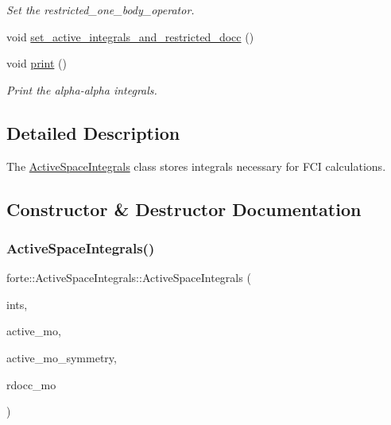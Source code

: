 \begin{DoxyCompactItemize}
\begin{DoxyCompactList}\small\item\em Set the restricted\+\_\+one\+\_\+body\+\_\+operator. \end{DoxyCompactList}\item 
void \mbox{\hyperlink{classforte_1_1_active_space_integrals_a43129d2c6aaed7ac76f2ed146cd6b57e}{set\+\_\+active\+\_\+integrals\+\_\+and\+\_\+restricted\+\_\+docc}} ()
\item 
void \mbox{\hyperlink{classforte_1_1_active_space_integrals_af93d7e92f4874dacbdd992810bad04c4}{print}} ()
\begin{DoxyCompactList}\small\item\em Print the alpha-\/alpha integrals. \end{DoxyCompactList}\end{DoxyCompactItemize}


\subsection{Detailed Description}
The \mbox{\hyperlink{classforte_1_1_active_space_integrals}{Active\+Space\+Integrals}} class stores integrals necessary for F\+CI calculations. 

\subsection{Constructor \& Destructor Documentation}
\mbox{\label{classforte_1_1_active_space_integrals_a0b136807e7e7c9aa516d4db75c9f6fd8}} 
\subsubsection{\texorpdfstring{Active\+Space\+Integrals()}{ActiveSpaceIntegrals()}}
{\footnotesize\ttfamily forte\+::\+Active\+Space\+Integrals\+::\+Active\+Space\+Integrals (\begin{DoxyParamCaption}\item[{std\+::shared\+\_\+ptr$<$ \mbox{\hyperlink{classforte_1_1_forte_integrals}{Forte\+Integrals}} $>$}]{ints,  }\item[{const std\+::vector$<$ size\+\_\+t $>$ \&}]{active\+\_\+mo,  }\item[{const std\+::vector$<$ int $>$ \&}]{active\+\_\+mo\+\_\+symmetry,  }\item[{const std\+::vector$<$ size\+\_\+t $>$ \&}]{rdocc\+\_\+mo }\end{DoxyParamCaption})}



